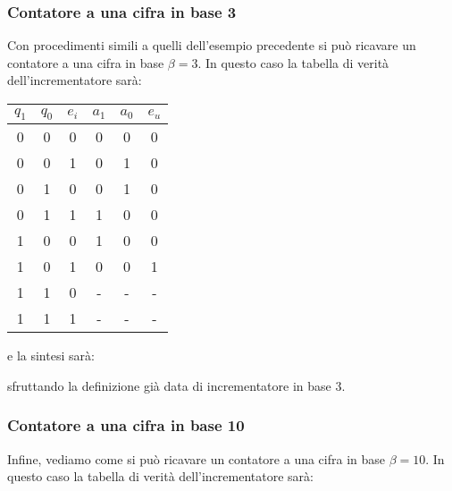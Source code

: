 \documentclass[a4paper,11pt]{article}
\begin{document}
\subsubsection{Contatore a una cifra in base 3}
Con procedimenti simili a quelli dell'esempio precedente si può ricavare un contatore a una cifra in base $\beta = 3$.
In questo caso la tabella di verità dell'incrementatore sarà:
\begin{table}[H]
	\center 
	\begin{tabular} { c c c | c c c }
		$q_1$ & $q_0$ & $e_i$ & $a_1$ & $a_0$ & $e_u$ \\ 
		\hline
		0 & 0 & 0 & 0 & 0 & 0 \\ 
		0 & 0 & 1 & 0 & 1 & 0 \\ 
		0 & 1 & 0 & 0 & 1 & 0 \\ 
		0 & 1 & 1 & 1 & 0 & 0 \\
		1 & 0 & 0 & 1 & 0 & 0 \\ 
		1 & 0 & 1 & 0 & 0 & 1 \\ 
		1 & 1 & 0 & - & - & - \\ 
		1 & 1 & 1 & - & - & -
	\end{tabular}
\end{table}

e la sintesi sarà:

sfruttando la definizione già data di incrementatore in base 3.

\subsubsection{Contatore a una cifra in base 10}
Infine, vediamo come si può ricavare un contatore a una cifra in base $\beta = 10$.
In questo caso la tabella di verità dell'incrementatore sarà:
\end{document}
